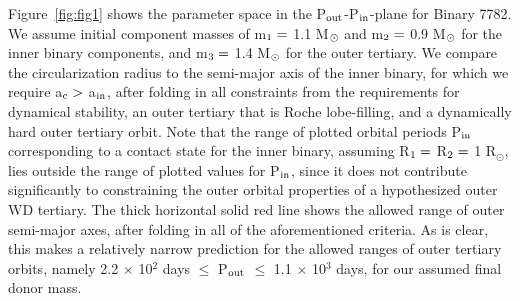 \documentclass{aastex62}
\begin{document}
Figure~\ref{fig:fig1} shows the parameter space in the P$_{\rm out}$-P$_{\rm in}$-plane for Binary 7782.  We assume initial component masses of m$_{\rm 1} =$ 1.1 M$_{\rm \odot}$ and m$_{\rm 2} =$ 0.9 M$_{\rm \odot}$ for the inner binary components, and m$_{\rm 3} =$ 1.4 M$_{\rm \odot}$ for the outer tertiary.  We compare the circularization radius to the semi-major axis of the inner binary, for which we require a$_{\rm c} >$ a$_{\rm in}$, after folding in all constraints from the requirements for dynamical stability, an outer tertiary that is Roche lobe-filling, and a dynamically hard outer tertiary orbit.  Note that the range of plotted orbital periods P$_{\rm in}$ corresponding to a contact state for the inner binary, assuming R$_{\rm 1} =$ R$_{\rm 2} =$ 1 R$_{\odot}$, lies outside the range of plotted values for P$_{\rm in}$, since it does not contribute significantly to constraining the outer orbital properties of a hypothesized outer WD tertiary.  The thick horizontal solid red line shows the allowed range of outer semi-major axes, after folding in all of the aforementioned criteria.  As is clear, this makes a relatively narrow prediction for the allowed ranges of outer tertiary orbits, namely 2.2 $\times$ 10$^{2}$ days $\le$ P$_{\rm out}$ $\le$ 1.1 $\times$ 10$^3$ days, for our assumed final donor mass.  
\end{document}
